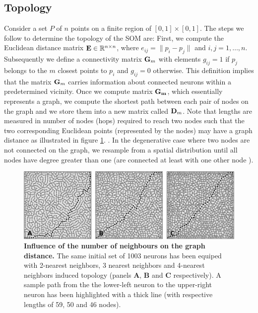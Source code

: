 \subsection{Topology}
\label{sec:topo}

Consider a set $P$ of $n$ points on a finite region of $[0, 1] \times [0, 1]$. 
The steps we follow to determine the topology of the SOM are:
First, we compute the Euclidean distance matrix ${\bf E} \in \mathbb{R}^{n\times n}$,
where $e_{ij} = \lVert p_i - p_j \rVert$ and $i, j=1, \ldots, n$. Subsequently 
we define a connectivity matrix ${\bf G}_m$ with elements $g_{ij} = 1$ if 
$p_j$ belongs to the $m$ closest points to $p_i$ and $g_{ij} = 0$ otherwise.
This definition implies that the matrix ${\bf G}_m$ carries information about
connected neurons within a predetermined vicinity. Once we compute matrix
${\bf G_m}$, which essentially represents a graph, we compute the shortest
path between each pair of nodes on the graph and we store them into a new
matrix called ${\bf D}_m$. Note that lengths are measured in number of nodes
(hops) required to reach two nodes such that the two corresponding Euclidean
points (represented by the nodes) may have a graph distance as illustrated in 
figure \ref{fig:topology}. 
.
In the degenerative case where two nodes are not connected on the graph, we
resample from a spatial distribution until all nodes have degree greater than 
one (are connected at least with one other node ).
\begin{figure}
  \includegraphics[width=\columnwidth]{figures/distances.pdf}
  \caption{\textbf{Influence of the number of neighbours on the graph
    distance.} The same initial set of 1003 neurons has been equiped with
    2-nearest neighbors, 3 nearest neighbors and 4-nearest neighbors induced
    topology (panels \textbf{A}, \textbf{B} and \textbf{C} respectively). A
    sample path from the the lower-left neuron to the upper-right neuron has
    been highlighted with a thick line (with respective lengths of 59, 50 and
    46 nodes).}
  \label{fig:topology}
\end{figure}


